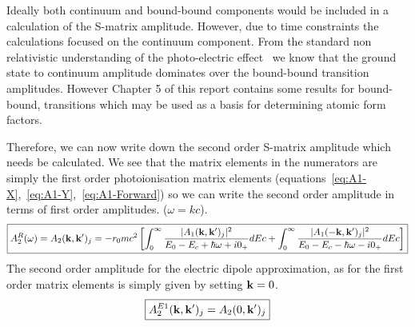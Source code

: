 Ideally both continuum and bound-bound components would be included in
a calculation of the S-matrix amplitude. However, due to time constraints the
calculations focused on the continuum component. From the standard
non relativistic understanding of the photo-electric 
effect~\cite{Sakurai-Modern,Kissel-S-Matrix,Chantler-Book} we know that the 
ground state to continuum amplitude dominates over the bound-bound transition
amplitudes. However Chapter 5 of this report contains some results for
bound-bound, transitions which may be used as a basis for determining 
atomic form factors.

Therefore, we can now write down the second order S-matrix amplitude which needs
be calculated. We see that the matrix elements in the numerators are simply
the first order photoionisation matrix elements 
(equations~\ref{eq:A1-X},~\ref{eq:A1-Y},~\ref{eq:A1-Forward}) so we can write
the second order amplitude in terms of first order amplitudes.
($\omega = kc$).
\begin{equation} \label{eq:A2}
\boxed{
     A_2^R(\omega) = A_2(\mathbf{k},\mathbf{k'})_j =
         -r_0 mc^2  
        \left[
        \int_0^\infty
             \frac{
             | A_1(\mathbf{k},\mathbf{k'})_j |^2
        }{
            E_0 - E_c + \hbar\omega + i0_+
        } 
        dEc
        +
        \int_0^\infty
        \frac{
            |A_1(\mathbf{-k},\mathbf{k'})_j |^2
        }{
           E_0 - E_c - \hbar\omega - i0_+
        }
        dEc
        \right]
}
\end{equation}
The second order amplitude for the electric dipole approximation, 
as for the first order matrix elements is simply given by setting $\mathbf{k}=0$.
\begin{equation} \label{eq:A2-Dipole}
    \boxed{
       A_2^{E1}(\mathbf{k},\mathbf{k'})_j  = A_2(0,\mathbf{k'})_j  
    }
\end{equation}
